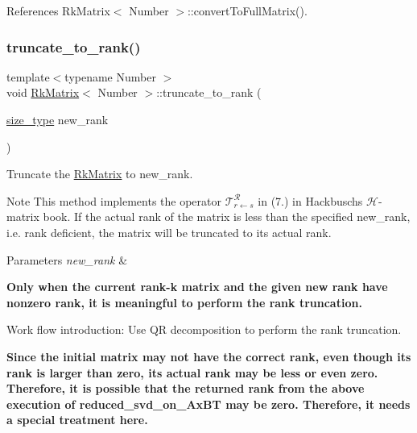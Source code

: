 References Rk\+Matrix$<$ Number $>$\+::convert\+To\+Full\+Matrix().

\mbox{\label{classRkMatrix_a555e0c3184b8411db1350c8fe1e875a0}} 
\subsubsection{\texorpdfstring{truncate\+\_\+to\+\_\+rank()}{truncate\_to\_rank()}\hspace{0.1cm}{\footnotesize\ttfamily [1/2]}}
{\footnotesize\ttfamily template$<$typename Number $>$ \\
void \hyperlink{classRkMatrix}{Rk\+Matrix}$<$ Number $>$\+::truncate\+\_\+to\+\_\+rank (\begin{DoxyParamCaption}\item[{\hyperlink{classRkMatrix_add060bfc3a4cc77f858c3d6dd58cadd5}{size\+\_\+type}}]{new\+\_\+rank }\end{DoxyParamCaption})}

Truncate the \hyperlink{classRkMatrix}{Rk\+Matrix} to {\ttfamily new\+\_\+rank}.


\begin{DoxyDescription}
\item[Note ]This method implements the operator $\mathcal{T}_{r \leftarrow s}^{\mathcal{R}}$ in (7.) in Hackbusch\textquotesingle{}s $\mathcal{H}$-\/matrix book. If the actual rank of the matrix is less than the specified {\ttfamily new\+\_\+rank}, i.\+e. rank deficient, the matrix will be truncated to its actual rank. 
\end{DoxyDescription}
\begin{DoxyParams}{Parameters}
{\em new\+\_\+rank} & \\
\hline
\end{DoxyParams}
{\bfseries Only when the current rank-\/k matrix and the given new rank have nonzero rank, it is meaningful to perform the rank truncation.}

Work flow introduction\+: Use QR decomposition to perform the rank truncation.

{\bfseries Since the initial matrix may not have the correct rank, even though its {\ttfamily rank} is larger than zero, its actual {\ttfamily rank} may be less or even zero. Therefore, it is possible that the returned {\ttfamily rank} from the above execution of {\ttfamily reduced\+\_\+svd\+\_\+on\+\_\+\+Ax\+BT} may be zero. Therefore, it needs a special treatment here.}

